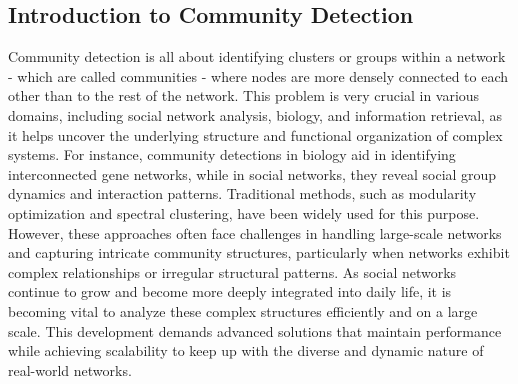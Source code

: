 \documentclass{article}
\begin{document}
\subsection{Introduction to Community Detection}
Community detection is all about identifying clusters or groups within a network - which are called communities - where nodes are more densely connected to each other than to the rest of the network. This problem is very crucial in various domains, including social network analysis, biology, and information retrieval, as it helps uncover the underlying structure and functional organization of complex systems. For instance, community detections in biology aid in identifying interconnected gene networks, while in social networks, they reveal social group dynamics and interaction patterns. Traditional methods, such as modularity optimization and spectral clustering, have been widely used for this purpose. However, these approaches often face challenges in handling large-scale networks and capturing intricate community structures, particularly when networks exhibit complex relationships or irregular structural patterns. As social networks continue to grow and become more deeply integrated into daily life, it is becoming vital to analyze these complex structures efficiently and on a large scale. This development demands advanced solutions that maintain performance while achieving scalability to keep up with the diverse and dynamic nature of real-world networks.
\end{document}
